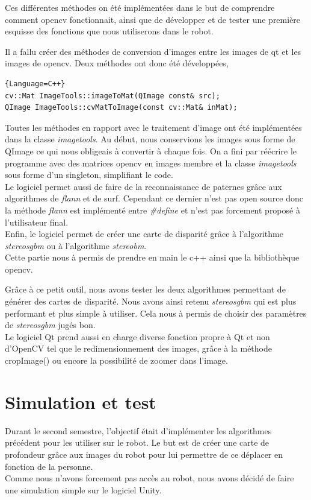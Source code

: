 \documentclass[12pt,a4paper]{report}
\begin{document}
Ces différentes méthodes on été implémentées dans le but de comprendre comment opencv fonctionnait, ainsi que de développer et de tester une première esquisse des fonctions que nous utiliserons dans le robot.

Il a fallu créer des méthodes de conversion d'images entre les images de qt et les images de opencv. Deux méthodes ont donc été développées,

\begin{lstlisting}{Language=C++}
cv::Mat ImageTools::imageToMat(QImage const& src);
QImage ImageTools::cvMatToImage(const cv::Mat& inMat);
\end{lstlisting}

Toutes les méthodes en rapport avec le traitement d'image ont été implémentées dans la classe \textit{imagetools}. Au début, nous conservions les images sous forme de QImage ce qui nous obligeais à convertir à chaque fois. On a fini par réécrire le programme avec des matrices opencv en images membre et la classe \textit{imagetools} sous forme d'un singleton, simplifiant le code.\\
Le logiciel permet aussi de faire de la reconnaissance de paternes grâce aux algorithmes de \textit{flann} et de surf. Cependant ce dernier n'est pas open source donc la méthode \textit{flann} est implémenté entre \textit{\#define} et n'est pas forcement proposé à l'utilisateur final.\\
Enfin, le logiciel permet de créer une carte de disparité grâce à l'algorithme \textit{stereosgbm} ou à l'algorithme \textit{stereobm}.\\

Cette partie nous à permis de prendre en main le c++ ainsi que la bibliothèque opencv. 

Grâce à ce petit outil, nous avons tester les deux algorithmes permettant de générer des cartes de disparité. Nous avons ainsi retenu \textit{stereosgbm} qui est plus performant et plus simple à utiliser. Cela nous à permis de choisir des paramètres de \textit{stereosgbm} jugés bon.\\

Le logiciel Qt prend aussi en charge diverse fonction propre à Qt et non d'OpenCV tel que le redimensionnement des images, grâce à la méthode cropImage() ou encore la possibilité de zoomer dans l'image.

\section{Simulation et test}
Durant le second semestre, l'objectif était d'implémenter les algorithmes précédent pour les utiliser sur le robot. Le but est de créer une carte de profondeur grâce aux images du robot pour lui permettre de ce déplacer en fonction de la personne.\\
Comme nous n'avons forcement pas accès au robot, nous avons décidé de faire une simulation simple sur le logiciel Unity.\\
\end{document}
